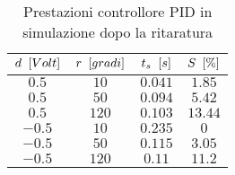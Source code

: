			\begin{center}
				 
			\end{center}	
			
			\begin{center}
				 
			\end{center}		
		
			\begin{table}[H]
				\centering
				\begin{tabular}{cccc}
					\toprule
					\textbf{$d \singleSpacing [Volt]$} & \textbf{$r \singleSpacing [gradi]$} & \textbf{$t_s \singleSpacing [s]$} & \textbf{$S \singleSpacing [\%]$}\\
					\midrule
					$0.5$   & $10$  & $0.041$ & $1.85$  \\
					$0.5$   & $50$  & $0.094$ & $5.42$  \\
					$0.5$   & $120$ & $0.103$ & $13.44$ \\
					$-0.5$  & $10$  & $0.235$ & $0$     \\
					$-0.5$  & $50$  & $0.115$ & $3.05$  \\ 	
					$-0.5$  & $120$ & $0.11$  & $11.2$  \\ 
					\bottomrule
				\end{tabular}
				\caption{Prestazioni controllore PID in simulazione dopo la ritaratura}
				\label{tab:PIDsimRit}
			\end{table}			